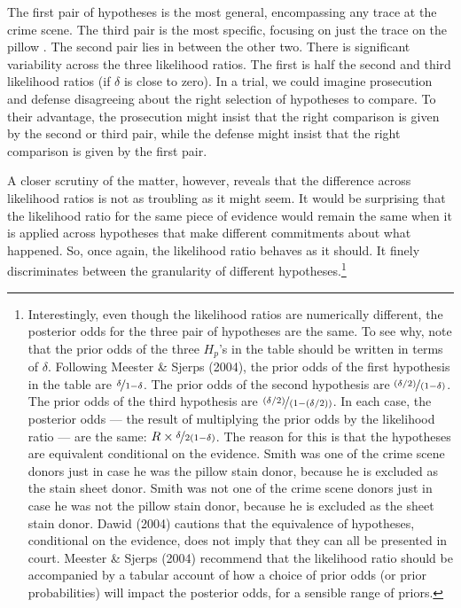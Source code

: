 \documentclass[
  10pt,
  dvipsnames,enabledeprecatedfontcommands]{scrartcl}
\begin{document}
\noindent The first pair of hypotheses is the most general, encompassing
any trace at the crime scene. The third pair is the most specific,
focusing on just the trace on the pillow . The second pair lies in
between the other two. There is significant variability across the three
likelihood ratios. The first is half the second and third likelihood
ratios (if \(\delta\) is close to zero). In a trial, we could imagine
prosecution and defense disagreeing about the right selection of
hypotheses to compare. To their advantage, the prosecution might insist
that the right comparison is given by the second or third pair, while
the defense might insist that the right comparison is given by the first
pair.

A closer scrutiny of the matter, however, reveals that the difference
across likelihood ratios is not as troubling as it might seem. It would
be surprising that the likelihood ratio for the same piece of evidence
would remain the same when it is applied across hypotheses that make
different commitments about what happened. So, once again, the
likelihood ratio behaves as it should. It finely discriminates between
the granularity of different hypotheses.\footnote{Interestingly, even
  though the likelihood ratios are numerically different, the posterior
  odds for the three pair of hypotheses are the same. To see why, note
  that the prior odds of the three \(H_p\)'s in the table should be
  written in terms of \(\delta\). Following Meester \& Sjerps (2004),
  the prior odds of the first hypothesis in the table are
  \(\nicefrac{\delta}{1-\delta}\). The prior odds of the second
  hypothesis are \(\nicefrac{(\delta/2)}{(1-\delta)}\). The prior odds
  of the third hypothesis are \(\nicefrac{(\delta/2)}{(1-(\delta/2))}\).
  In each case, the posterior odds --- the result of multiplying the
  prior odds by the likelihood ratio --- are the same:
  \(R\times \nicefrac{\delta}{2(1-\delta)}\). The reason for this is
  that the hypotheses are equivalent conditional on the evidence. Smith
  was one of the crime scene donors just in case he was the pillow stain
  donor, because he is excluded as the stain sheet donor. Smith was not
  one of the crime scene donors just in case he was not the pillow stain
  donor, because he is excluded as the sheet stain donor. Dawid (2004)
  cautions that the equivalence of hypotheses, conditional on the
  evidence, does not imply that they can all be presented in court.
  Meester \& Sjerps (2004) recommend that the likelihood ratio should be
  accompanied by a tabular account of how a choice of prior odds (or
  prior probabilities) will impact the posterior odds, for a sensible
  range of priors.}
\end{document}
